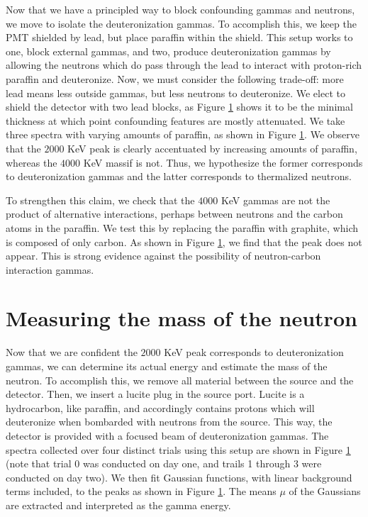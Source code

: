 \documentclass[12pt, letterpaper]{article}
\begin{document}
Now that we have a principled way to block confounding gammas and neutrons, we move to isolate the deuteronization gammas. To accomplish this, we keep the PMT shielded by lead, but place paraffin within the shield. This setup works to one, block external gammas, and two, produce deuteronization gammas by allowing the neutrons which do pass through the lead to interact with proton-rich paraffin and deuteronize. Now, we must consider the following trade-off: more lead means less outside gammas, but less neutrons to deuteronize. We elect to shield the detector with two lead blocks, as Figure \ref{} shows it to be the minimal thickness at which point confounding features are mostly attenuated. We take three spectra with varying amounts of paraffin, as shown in Figure \ref{}. We observe that the $2000$ KeV peak is clearly accentuated by increasing amounts of paraffin, whereas the $4000$ KeV massif is not. Thus, we hypothesize the former corresponds to deuteronization gammas and the latter corresponds to thermalized neutrons. 

To strengthen this claim, we check that the $4000$ KeV gammas are not the product of alternative interactions, perhaps between neutrons and the carbon atoms in the paraffin. We test this by replacing the paraffin with graphite, which is composed of only carbon. As shown in Figure \ref{}, we find that the peak does not appear. This is strong evidence against the possibility of neutron-carbon interaction gammas. 

\section{Measuring the mass of the neutron}

Now that we are confident the $2000$ KeV peak corresponds to deuteronization gammas, we can determine its actual energy and estimate the mass of the neutron. To accomplish this, we remove all material between the source and the detector. Then, we insert a lucite plug in the source port. Lucite is a hydrocarbon, like paraffin, and accordingly contains protons which will deuteronize when bombarded with neutrons from the source. This way, the detector is provided with a focused beam of deuteronization gammas. The spectra collected over four distinct trials using this setup are shown in Figure \ref{} (note that trial 0 was conducted on day one, and trails 1 through 3 were conducted on day two). We then fit Gaussian functions, with linear background terms included, to the peaks as shown in Figure \ref{}. The means $\mu$ of the Gaussians are extracted and interpreted as the gamma energy. 
\end{document}

